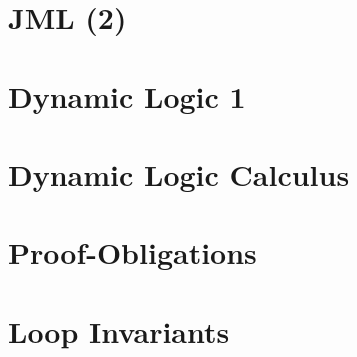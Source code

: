 \documentclass[12pt,accentcolor=tud1b,bibtotoc,colorback,linedtoc,liststotoc,bigchapter,noresetcounter]{tudreport}
\begin{document}
\section{JML (2)}

\newpage

\section{Dynamic Logic 1}

\newpage

\section{Dynamic Logic Calculus}

\newpage

\section{Proof-Obligations}

\newpage

\section{Loop Invariants}

\newpage
 
\end{document}
